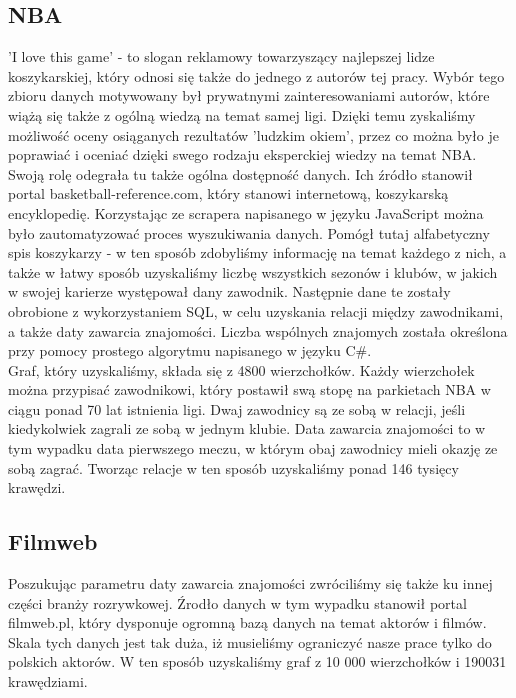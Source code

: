 \documentclass{article}
\begin{document}
\subsection{NBA}
'I love this game' - to slogan reklamowy towarzyszący najlepszej lidze koszykarskiej, który odnosi się także do jednego z autorów tej pracy. Wybór tego zbioru danych motywowany był prywatnymi zainteresowaniami autorów, które wiążą się także z ogólną wiedzą na temat samej ligi. Dzięki temu zyskaliśmy możliwość oceny osiąganych rezultatów 'ludzkim okiem', przez co można było je poprawiać i oceniać dzięki swego rodzaju eksperckiej wiedzy na temat NBA.\\

Swoją rolę odegrała tu także ogólna dostępność danych. Ich źródło stanowił portal basketball-reference.com, który stanowi internetową, koszykarską encyklopedię. Korzystając ze scrapera napisanego w języku JavaScript można było zautomatyzować proces wyszukiwania danych. Pomógł tutaj alfabetyczny spis koszykarzy - w ten sposób zdobyliśmy informację na temat każdego z nich, a także w łatwy sposób uzyskaliśmy liczbę wszystkich sezonów i klubów, w jakich w swojej karierze występował dany zawodnik. Następnie dane te zostały obrobione z wykorzystaniem SQL, w celu uzyskania relacji między zawodnikami, a także daty zawarcia znajomości. Liczba wspólnych znajomych została określona przy pomocy prostego algorytmu napisanego w języku C\#.\\

Graf, który uzyskaliśmy, składa się z 4800 wierzchołków. Każdy wierzchołek można przypisać zawodnikowi, który postawił swą stopę na parkietach NBA w ciągu ponad 70 lat istnienia ligi. Dwaj zawodnicy są ze sobą w relacji, jeśli kiedykolwiek zagrali ze sobą w jednym klubie. Data zawarcia znajomości to w tym wypadku data pierwszego meczu, w którym obaj zawodnicy mieli okazję ze sobą zagrać. Tworząc relacje w ten sposób uzyskaliśmy ponad 146 tysięcy krawędzi.

\subsection{Filmweb}
Poszukując parametru daty zawarcia znajomości zwróciliśmy się także ku innej części branży rozrywkowej. Źrodło danych w tym wypadku stanowił portal filmweb.pl, który dysponuje ogromną bazą danych na temat aktorów i filmów. Skala tych danych jest tak duża, iż musieliśmy ograniczyć nasze prace tylko do polskich aktorów. W ten sposób uzyskaliśmy graf z 10 000 wierzchołków i 190031 krawędziami.\\
\end{document}
